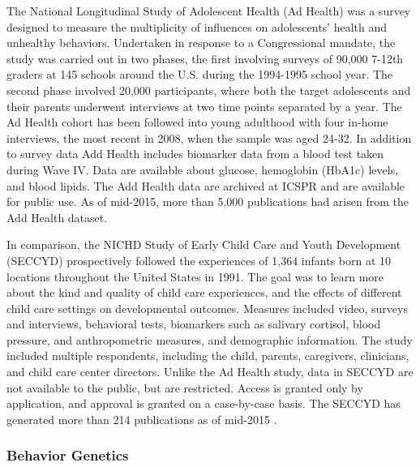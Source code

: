\documentclass[letterpaper,man,apacite]{apa6}
\begin{document}
The National Longitudinal Study of Adolescent Health (Ad Health) \cite{adolescent_health} was a survey designed to measure the multiplicity of influences on adolescents' health and unhealthy behaviors. 
Undertaken in response to a Congressional mandate, the study was carried out in two phases, the first involving surveys of 90,000 7-12th graders at 145 schools around the U.S. during the 1994-1995 school year. 
The second phase involved 20,000 participants, where both the target adolescents and their parents underwent interviews at two time points separated by a year. 
The Ad Health cohort has been followed into young adulthood with four in-home interviews, the most recent in 2008, when the sample was aged 24-32. 
In addition to survey data Add Health includes biomarker data from a blood test taken during Wave IV. 
Data are available about glucose, hemoglobin (HbA1c) levels, and blood lipids. 
The Add Health data \cite{harris_add_health} are archived at ICSPR \cite{ICPSR} and are available for public use.
As of mid-2015, more than 5,000 publications \cite{add_health_publications} had arisen from the Add Health dataset.

In comparison, the NICHD Study of Early Child Care and Youth Development (SECCYD) prospectively followed the experiences of 1,364 infants born at 10 locations throughout the United States in 1991.
The goal was to learn more about the kind and quality of child care experiences, and the effects of different child care settings on developmental outcomes. 
Measures included video, surveys and interviews, behavioral tests, biomarkers such as salivary cortisol, blood pressure, and anthropometric measures, and demographic information.
The study included multiple respondents, including the child, parents, caregivers, clinicians, and child care center directors.
Unlike the Ad Health study, data in SECCYD are not available to the public, but are restricted.
Access is granted only by application, and approval is granted on a case-by-case basis.
The SECCYD has generated more than 214 publications as of mid-2015 \cite{seccyd_publications}.

\subsubsection{Behavior Genetics}
\end{document}

